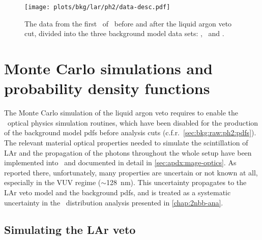 \begin{figure}
  \centering
  \texttt{[image: plots/bkg/lar/ph2/data-desc.pdf]}
  \caption{%
    The data from the first \gexpophasetwobkg\ of \gerdatwo\ before and after the liquid argon veto
    cut, divided into the three background model data sets: \enrBEGeII, \enrCoaxII\ and
    \enrGeII.
  }\label{fig:bkg:lar:ph2:data-desc}
\end{figure}

\section{Monte Carlo simulations and probability density functions}%
\label{sec:bkg:lar:ph2:pdfs}

The Monte Carlo simulation of the liquid argon veto requires to enable the \geant\ optical physics
simulation routines, which have been disabled for the production of the background model
pdfs before analysis cuts (c.f.r.~\cref{sec:bkg:raw:ph2:pdfs}). The relevant material
optical properties needed to simulate the scintillation of LAr and the propagation of the
photons throughout the whole setup have been implemented into \mage\ and documented in
detail in \cref{sec:apdx:mage-optics}. As reported there, unfortunately, many properties
are uncertain or not known at all, especially in the VUV regime ($\sim$128~nm). This
uncertainty propagates to the LAr veto model and the background pdfs, and is treated as a
systematic uncertainty in the \nnbb\ distribution analysis presented in
\cref{chap:2nbb-ana}.

\subsection{Simulating the LAr veto}%
\label{sec:bkg:lar:ph2:heatmap}


